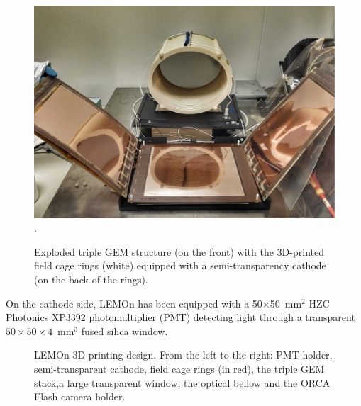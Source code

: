 \documentclass[%
 aip,
 amsmath,amssymb,
 reprint,%
]{revtex4-1}
\begin{document}
\begin{figure}[!ht]
\centering
\includegraphics[scale=0.290]{Fig1-gem.pdf}\DeclareGraphicsExtensions.
\caption{Exploded triple GEM structure (on the front)  with  the 3D-printed field cage rings (white)  equipped with a semi-transparency cathode (on the back of the rings).}
\label{fig:gem}
\end{figure}

On the cathode side, LEMOn has been equipped with a 50$\times$50~mm$^2$ HZC Photonics XP3392 photomultiplier \cite{PMTPhotonics} (PMT) detecting light through a transparent $50\times50\times4$~mm$^3$ fused silica window.
\begin{figure}[!ht]
\centering
\caption{LEMOn 3D printing design. From the left to the right:  PMT holder, semi-transparent cathode, field cage rings (in red),  the triple GEM stack,a large transparent window, the optical  bellow and the  ORCA Flash camera holder.}
\label{fig:sex}
\end{figure}
\end{document}
